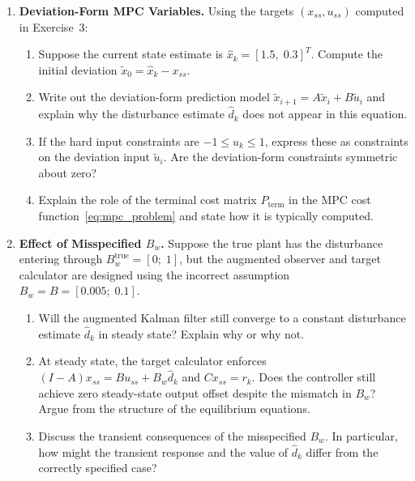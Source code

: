 \begin{enumerate}
	\item \textbf{Deviation-Form MPC Variables.}
	Using the targets \((x_{ss}, u_{ss})\) computed in Exercise~3:
	\begin{enumerate}
		\item Suppose the current state estimate is \(\hat{x}_k = [1.5,\; 0.3]^T\). Compute the initial deviation \(\tilde{x}_0 = \hat{x}_k - x_{ss}\).
		\item Write out the deviation-form prediction model \(\tilde{x}_{i+1} = A \tilde{x}_i + B \tilde{u}_i\) and explain why the disturbance estimate \(\hat{d}_k\) does not appear in this equation.
		\item If the hard input constraints are \(-1 \le u_k \le 1\), express these as constraints on the deviation input \(\tilde{u}_i\). Are the deviation-form constraints symmetric about zero?
		\item Explain the role of the terminal cost matrix \(P_{\mathrm{term}}\) in the MPC cost function~\eqref{eq:mpc_problem} and state how it is typically computed.
	\end{enumerate}

	\item \textbf{Effect of Misspecified \(B_w\).}
	Suppose the true plant has the disturbance entering through \(B_w^{\mathrm{true}} = [0;\; 1]\), but the augmented observer and target calculator are designed using the incorrect assumption \(B_w = B = [0.005;\; 0.1]\).
	\begin{enumerate}
		\item Will the augmented Kalman filter still converge to a constant disturbance estimate \(\hat{d}_k\) in steady state? Explain why or why not.
		\item At steady state, the target calculator enforces \((I-A)x_{ss} = B u_{ss} + B_w \hat{d}_k\) and \(C x_{ss} = r_k\). Does the controller still achieve zero steady-state output offset despite the mismatch in \(B_w\)? Argue from the structure of the equilibrium equations.
		\item Discuss the transient consequences of the misspecified \(B_w\). In particular, how might the transient response and the value of \(\hat{d}_k\) differ from the correctly specified case?
	\end{enumerate}


\end{enumerate}
